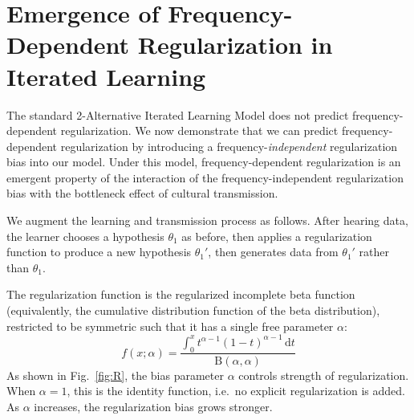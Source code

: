 \documentclass{evolang11}
\begin{document}
\section{Emergence of Frequency-Dependent Regularization in Iterated Learning}
\label{sec:emerg-freq-depend}
%
The standard 2-Alternative Iterated Learning Model does not predict frequency-dependent regularization. We now demonstrate that we can predict frequency-dependent regularization by introducing a frequency-\emph{independent} regularization bias into our model. Under this model, frequency-dependent regularization is an emergent property of the interaction of the frequency-independent regularization bias with the bottleneck effect of cultural transmission.


We augment the learning and transmission process as follows. After hearing data, the learner chooses a hypothesis $\theta_1$ as before, then applies a regularization function to produce a new hypothesis $\theta_1'$, then generates data from $\theta_1'$ rather than $\theta_1$.

The regularization function is the regularized incomplete beta function (equivalently, the cumulative distribution function of the beta distribution), restricted to be symmetric such that it has a single free parameter $\alpha$:
\begin{equation}
f(x;\alpha) = \frac{\int_0^{x}t^{\alpha-1}(1-t)^{\alpha-1}\,\mathrm{d}t}{\mathrm{B}(\alpha,\alpha)}
\end{equation}
As shown in Fig.\ \ref{fig:R}, the bias parameter $\alpha$ controls strength of regularization. When $\alpha=1$, this is the identity function, i.e.\ no explicit regularization is added. As $\alpha$ increases, the regularization bias grows stronger. 
\end{document}
